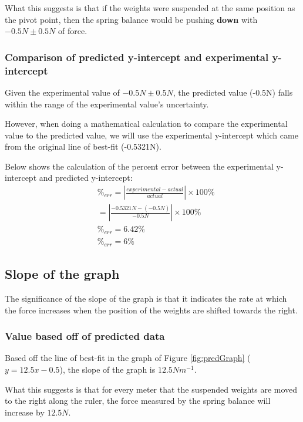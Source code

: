 \documentclass[letterpaper, 12pt]{article}
\begin{document}
What this suggests is that if the weights were suspended at the same
position as the pivot point, then the spring balance would be pushing
\textbf{down} with $-0.5\unit{N} \pm 0.5\unit{N}$ of force.

\subsubsection{Comparison of predicted y-intercept and experimental y-intercept}

Given the experimental value of $-0.5\unit{N} \pm 0.5\unit{N}$,
the predicted value (-0.5\unit{N}) falls within the range of the
experimental value's uncertainty.

However, when doing a mathematical calculation to compare the experimental
value to the predicted value, we will use the experimental
y-intercept which came from the original line of best-fit
(-0.5321\unit{N}).

Below shows the calculation of the percent error between the experimental
y-intercept and predicted y-intercept:
\begin{align*}
     & \%_{err} = \left|\frac{experimental - actual}{actual}\right| \times 100\%
    \\
     & = \left|\frac{-0.5321\unit{N} - (-0.5\unit{N})}{-0.5\unit{N}}\right| \times 100\%
    \\
     & \%_{err} = 6.42\%
    \\
     & \%_{err} = 6\%
\end{align*}

\subsection{Slope of the graph}

The significance of the slope of the graph is that it indicates the rate
at which the force increases when the position of the weights are shifted
towards the right.

\subsubsection{Value based off of predicted data}

Based off the line of best-fit in the graph of Figure \ref*{fig:predGraph}
($y=12.5x-0.5$),
the slope of the graph is $12.5\unit{Nm^{-1}}$.

What this suggests is that for every meter that the suspended weights
are moved to the right along the ruler, the force measured by the
spring balance will increase by $12.5\unit{N}$.
\end{document}
